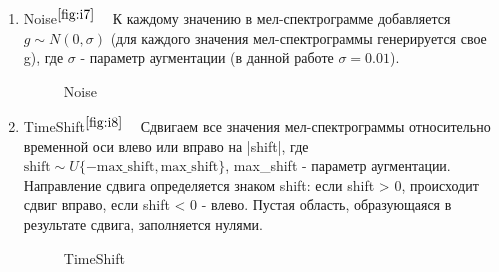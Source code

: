 \documentclass[12pt, fleqn]{article}
\begin{document}
\begin{enumerate}
\begin{figure}[ht!]
		\label{fig:i6}
	\end{figure}
	\item Noise$^{\ref{fig:i7}}$ ~\cite{AudioClassification}  \newline 
	К каждому значению в мел-спектрограмме добавляется $g \sim N(0, \sigma)$ (для каждого значения мел-спектрограммы генерируется свое g), где $\sigma$ - параметр аугментации (в данной работе $\sigma = 0.01$). 
	\begin{figure}[ht!]
		\caption{Noise}
		\label{fig:i7}
	\end{figure}
	\item TimeShift$^{\ref{fig:i8}}$ ~\cite{AudioClassification} \newline Сдвигаем все значения мел-спектрограммы относительно временной оси влево или вправо на |shift|, где $\text{shift} \sim U\{-\text{max\_shift}, \text{max\_shift}\}$, max\_shift - параметр аугментации. Направление сдвига определяется знаком shift: если \newline shift > 0, происходит сдвиг вправо, если shift < 0 - влево. Пустая область, образующаяся в результате сдвига, заполняется нулями.
	\begin{figure}[ht!]
		\caption{TimeShift}
		\label{fig:i8}
	\end{figure}
\end{enumerate}
\end{document}
